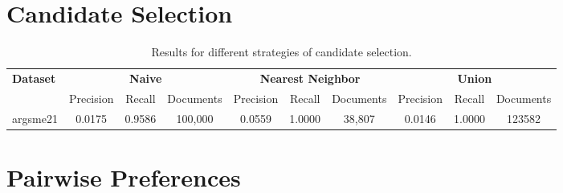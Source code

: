 \section{Candidate Selection}\label{eval-candidate-selection}

\begin{sidewaystable}
    \centering
    \caption{Results for different strategies of candidate selection.}
    \begin{tabular}{lccccccccc}
        \toprule
        \textbf{Dataset} & \multicolumn{3}{c}{\textbf{Naive}} & \multicolumn{3}{c}{\textbf{Nearest Neighbor}} & \multicolumn{3}{c}{\textbf{Union}} \\
        \cmidrule(lr){2-4} \cmidrule(lr){5-7} \cmidrule(lr){8-10}
                         & Precision & Recall & Documents & Precision & Recall & Documents & Precision & Recall & Documents \\
        \midrule

        argsme21 & 0.0175 & 0.9586 & 100,000 & 0.0559 & 1.0000 & 38,807 & 0.0146 & 1.0000 & 123582 \\

        \bottomrule 
    \end{tabular}
\end{sidewaystable}

\section{Pairwise Preferences}\label{eval-pairwise-preferences}